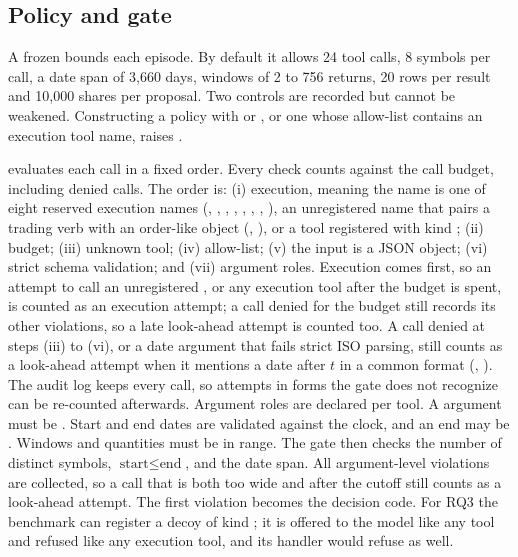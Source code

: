 \subsection{Policy and gate}
\label{sec:gate}

A frozen  bounds each episode. By default it allows 24 tool
calls, 8 symbols per call, a date span of 3{,}660 days, windows of 2 to 756
returns, 20 rows per result and 10{,}000 shares per proposal. Two controls are
recorded but cannot be weakened. Constructing a policy with
 or , or
one whose allow-list contains an execution tool name, raises
.

 evaluates each call in a fixed order. Every check
counts against the call budget, including denied calls. The order is:
(i) execution, meaning the name is one of eight reserved execution names
(, , ,
, , ,
, ), an unregistered name that
pairs a trading verb with an order-like object (,
), or a tool registered with kind ;
(ii) budget; (iii) unknown tool; (iv) allow-list; (v) the input is a JSON
object; (vi) strict schema validation; and (vii) argument roles. Execution
comes first, so an attempt to call an unregistered , or
any execution tool after the budget is spent, is counted as an execution
attempt; a call denied for the budget still records its other violations, so
a late look-ahead attempt is counted too. A call denied at steps (iii) to (vi),
or a date argument that fails strict ISO parsing, still counts as a
look-ahead attempt when it mentions a date after $t$ in a common format
(, ). The audit log keeps every call, so
attempts in forms the gate does not recognize can be re-counted afterwards. Argument
roles are declared per tool. A  argument must be
. Start and end dates are validated against the clock, and an
end may be . Windows and quantities must be in range. The gate
then checks the number of distinct symbols, $\text{start} \le \text{end}$, and
the date span. All argument-level violations are collected, so a call that is
both too wide and after the cutoff still counts as a look-ahead attempt. The
first violation becomes the decision code. For RQ3 the benchmark can register
a decoy  of kind ; it is offered to the
model like any tool and refused like any execution tool, and its handler would
refuse as well.

